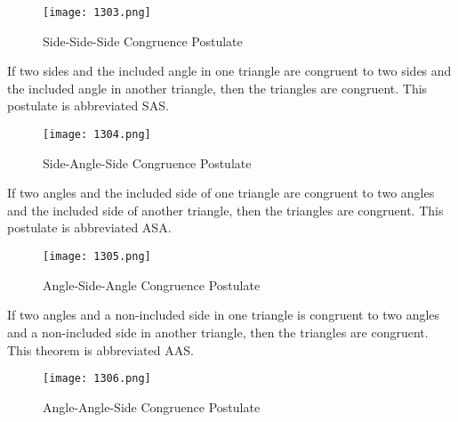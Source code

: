 \begin{figure}[htb!]
  \centering
  \texttt{[image: 1303.png]}
  \caption{Side-Side-Side Congruence Postulate}
\end{figure}

\begin{tcolorbox}[colback=RoyalPurple!5!white,colframe=RoyalPurple!75!black,title=Side-Angle-Side Congruence Postulate]
  If two sides and the included angle in one triangle are congruent to two sides and the included angle in another triangle, then the triangles are congruent. This postulate is abbreviated SAS.
\end{tcolorbox}

\begin{figure}[htb!]
  \centering
  \texttt{[image: 1304.png]}
  \caption{Side-Angle-Side Congruence Postulate}
\end{figure}

\newpage

\begin{tcolorbox}[colback=RoyalPurple!5!white,colframe=RoyalPurple!75!black,title=Angle-Side-Angle Congruence Postulate]
  If two angles and the included side of one triangle are congruent to two angles and the included side of another triangle, then the triangles are congruent. This postulate is abbreviated ASA.
\end{tcolorbox}

\begin{figure}[htb!]
  \centering
  \texttt{[image: 1305.png]}
  \caption{Angle-Side-Angle Congruence Postulate}
\end{figure}

\begin{tcolorbox}[colback=red!5!white,colframe=red!75!black,title=Angle-Angle-Side Congruence Theorem]
  If two angles and a non-included side in one triangle is congruent to two angles and a non-included side in another triangle, then the triangles are congruent. This theorem is abbreviated AAS.
\end{tcolorbox}

\begin{figure}[htb!]
  \centering
  \texttt{[image: 1306.png]}
  \caption{Angle-Angle-Side Congruence Postulate}
\end{figure}

\vspace{.5cm}

